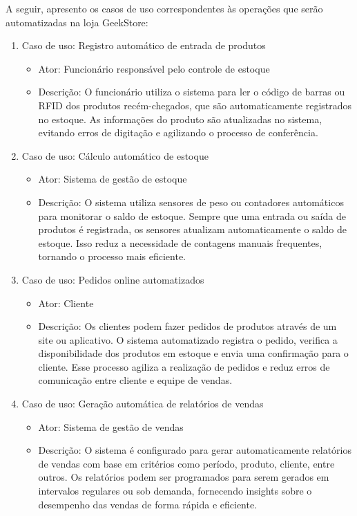 \documentclass[
	12pt,				%
	openright,			%
	twoside,			%
	a4paper,			%
	english,			%
	brazil				%
	]{abntex2}
\begin{document}
A seguir, apresento os casos de uso correspondentes às operações que serão automatizadas na loja GeekStore:

\begin{enumerate}
    \item Caso de uso: Registro automático de entrada de produtos
    \begin{itemize}
        \item Ator: Funcionário responsável pelo controle de estoque
        \item Descrição: O funcionário utiliza o sistema para ler o código de barras ou RFID dos produtos recém-chegados, que são automaticamente registrados no estoque. As informações do produto são atualizadas no sistema, evitando erros de digitação e agilizando o processo de conferência.
    \end{itemize}
    
    \item Caso de uso: Cálculo automático de estoque
    \begin{itemize}
        \item Ator: Sistema de gestão de estoque
        \item Descrição: O sistema utiliza sensores de peso ou contadores automáticos para monitorar o saldo de estoque. Sempre que uma entrada ou saída de produtos é registrada, os sensores atualizam automaticamente o saldo de estoque. Isso reduz a necessidade de contagens manuais frequentes, tornando o processo mais eficiente.
    \end{itemize}
    
    \item Caso de uso: Pedidos online automatizados
    \begin{itemize}
        \item Ator: Cliente
        \item Descrição: Os clientes podem fazer pedidos de produtos através de um site ou aplicativo. O sistema automatizado registra o pedido, verifica a disponibilidade dos produtos em estoque e envia uma confirmação para o cliente. Esse processo agiliza a realização de pedidos e reduz erros de comunicação entre cliente e equipe de vendas.
    \end{itemize}
    
    \item Caso de uso: Geração automática de relatórios de vendas
    \begin{itemize}
        \item Ator: Sistema de gestão de vendas
        \item Descrição: O sistema é configurado para gerar automaticamente relatórios de vendas com base em critérios como período, produto, cliente, entre outros. Os relatórios podem ser programados para serem gerados em intervalos regulares ou sob demanda, fornecendo insights sobre o desempenho das vendas de forma rápida e eficiente.
    \end{itemize}
    

\end{enumerate}
\end{document}

